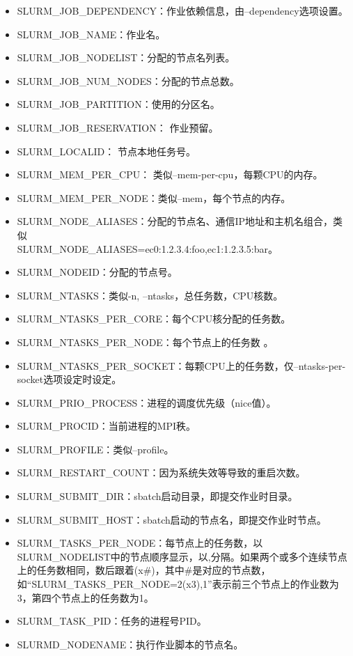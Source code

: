 \begin{itemize}
      \item SLURM\_JOB\_DEPENDENCY：作业依赖信息，由--dependency选项设置。
      \item SLURM\_JOB\_NAME：作业名。
      \item SLURM\_JOB\_NODELIST：分配的节点名列表。
      \item SLURM\_JOB\_NUM\_NODES：分配的节点总数。
      \item SLURM\_JOB\_PARTITION：使用的分区名。
      \item SLURM\_JOB\_RESERVATION： 作业预留。
      \item SLURM\_LOCALID： 节点本地任务号。
      \item SLURM\_MEM\_PER\_CPU： 类似--mem-per-cpu，每颗CPU的内存。
      \item SLURM\_MEM\_PER\_NODE：类似--mem，每个节点的内存。
      \item SLURM\_NODE\_ALIASES：分配的节点名、通信IP地址和主机名组合，类似\\SLURM\_NODE\_ALIASES=ec0:1.2.3.4:foo,ec1:1.2.3.5:bar。
      \item SLURM\_NODEID：分配的节点号。
      \item SLURM\_NTASKS：类似-n, --ntasks，总任务数，CPU核数。
      \item SLURM\_NTASKS\_PER\_CORE：每个CPU核分配的任务数。
      \item SLURM\_NTASKS\_PER\_NODE：每个节点上的任务数 。
      \item SLURM\_NTASKS\_PER\_SOCKET：每颗CPU上的任务数，仅--ntasks-per-socket选项设定时设定。
      \item SLURM\_PRIO\_PROCESS：进程的调度优先级（nice值）。
      \item SLURM\_PROCID：当前进程的MPI秩。
      \item SLURM\_PROFILE：类似--profile。
      \item SLURM\_RESTART\_COUNT：因为系统失效等导致的重启次数。
      \item SLURM\_SUBMIT\_DIR：sbatch启动目录，即提交作业时目录。
      \item SLURM\_SUBMIT\_HOST：sbatch启动的节点名，即提交作业时节点。
      \item SLURM\_TASKS\_PER\_NODE：每节点上的任务数，以SLURM\_NODELIST中的节点顺序显示，以,分隔。如果两个或多个连续节点上的任务数相同，数后跟着(x\#)，其中\#是对应的节点数，如``SLURM\_TASKS\_PER\_NODE=2(x3),1''表示前三个节点上的作业数为3，第四个节点上的任务数为1。
      \item SLURM\_TASK\_PID：任务的进程号PID。
      \item SLURMD\_NODENAME：执行作业脚本的节点名。
\end{itemize}

